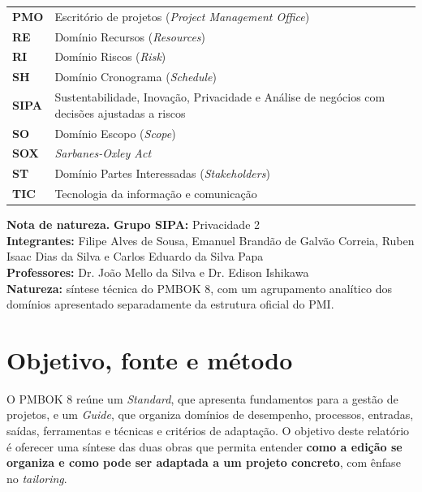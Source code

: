 \documentclass[11pt,a4paper]{article}
\newcommand{\SingleSpacing}{}
\newcommand{\onelineskip}{\baselineskip}
\begin{document}
\begin{longtable}{@{}>{\raggedright\arraybackslash}p{2.6cm}>{\raggedright\arraybackslash}p{\dimexpr\linewidth-2.6cm-2\tabcolsep\relax}@{}}
\textbf{PMO} & Escritório de projetos (\textit{Project Management Office})\\[2pt]
\textbf{RE} & Domínio Recursos (\textit{Resources})\\[2pt]
\textbf{RI} & Domínio Riscos (\textit{Risk})\\[2pt]
\textbf{SH} & Domínio Cronograma (\textit{Schedule})\\[2pt]
\textbf{SIPA} & Sustentabilidade, Inovação, Privacidade e Análise de negócios com decisões ajustadas a riscos\\[2pt]
\textbf{SO} & Domínio Escopo (\textit{Scope})\\[2pt]
\textbf{SOX} & \textit{Sarbanes-Oxley Act}\\[2pt]
\textbf{ST} & Domínio Partes Interessadas (\textit{Stakeholders})\\[2pt]
\textbf{TIC} & Tecnologia da informação e comunicação\\[2pt]
\end{longtable}
\endgroup
\clearpage

\tableofcontents
\bigskip
\listoffigures
\bigskip
\listoftables
\clearpage
{}
\setcounter{table}{0}

\begin{flushleft}\small\SingleSpacing
\noindent\textbf{Nota de natureza.} \textbf{Grupo SIPA:} Privacidade 2\\ \textbf{Integrantes:} Filipe Alves de Sousa, Emanuel Brandão de Galvão Correia, Ruben Isaac Dias da Silva e Carlos Eduardo da Silva Papa\\ \textbf{Professores:} Dr. João Mello da Silva e Dr. Edison Ishikawa\\ \textbf{Natureza:} síntese técnica do PMBOK 8, com um agrupamento analítico dos domínios apresentado separadamente da estrutura oficial do PMI.
\end{flushleft}
\vspace{\onelineskip}

\section{Objetivo, fonte e método}

O PMBOK 8 reúne um \textit{Standard}, que apresenta fundamentos para a gestão de projetos, e um \textit{Guide}, que organiza domínios de desempenho, processos, entradas, saídas, ferramentas e técnicas e critérios de adaptação. O objetivo deste relatório é oferecer uma síntese das duas obras que permita entender \textbf{como a edição se organiza e como pode ser adaptada a um projeto concreto}, com ênfase no \textit{tailoring}.
\end{document}
